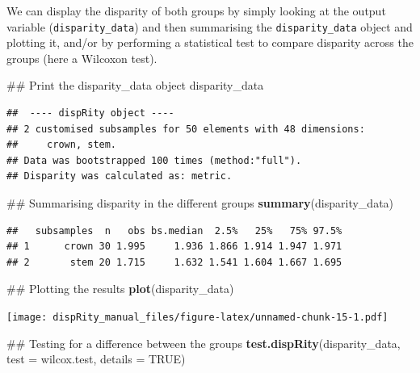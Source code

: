 \documentclass[]{book}
\newenvironment{Shaded}{\begin{snugshade}}{\end{snugshade}}
\newcommand{\KeywordTok}[1]{\textcolor[rgb]{0.13,0.29,0.53}{\textbf{#1}}}
\newcommand{\DataTypeTok}[1]{\textcolor[rgb]{0.13,0.29,0.53}{#1}}
\newcommand{\OtherTok}[1]{\textcolor[rgb]{0.56,0.35,0.01}{#1}}
\newcommand{\NormalTok}[1]{#1}
\theoremstyle{definition}
\theoremstyle{definition}
\theoremstyle{remark}
\begin{document}
We can display the disparity of both groups by simply looking at the
output variable (\texttt{disparity\_data}) and then summarising the
\texttt{disparity\_data} object and plotting it, and/or by performing a
statistical test to compare disparity across the groups (here a Wilcoxon
test).

\begin{Shaded}
\begin{Highlighting}[]
\NormalTok{## Print the disparity_data object}
\NormalTok{disparity_data}
\end{Highlighting}
\end{Shaded}

\begin{verbatim}
##  ---- dispRity object ---- 
## 2 customised subsamples for 50 elements with 48 dimensions:
##     crown, stem.
## Data was bootstrapped 100 times (method:"full").
## Disparity was calculated as: metric.
\end{verbatim}

\begin{Shaded}
\begin{Highlighting}[]
\NormalTok{## Summarising disparity in the different groups}
\KeywordTok{summary}\NormalTok{(disparity_data)}
\end{Highlighting}
\end{Shaded}

\begin{verbatim}
##   subsamples  n   obs bs.median  2.5%   25%   75% 97.5%
## 1      crown 30 1.995     1.936 1.866 1.914 1.947 1.971
## 2       stem 20 1.715     1.632 1.541 1.604 1.667 1.695
\end{verbatim}

\begin{Shaded}
\begin{Highlighting}[]
\NormalTok{## Plotting the results}
\KeywordTok{plot}\NormalTok{(disparity_data)}
\end{Highlighting}
\end{Shaded}

\texttt{[image: dispRity\_manual\_files/figure-latex/unnamed-chunk-15-1.pdf]}

\begin{Shaded}
\begin{Highlighting}[]
\NormalTok{## Testing for a difference between the groups}
\KeywordTok{test.dispRity}\NormalTok{(disparity_data, }\DataTypeTok{test =}\NormalTok{ wilcox.test, }\DataTypeTok{details =} \OtherTok{TRUE}\NormalTok{)}
\end{Highlighting}
\end{Shaded}
\end{document}
